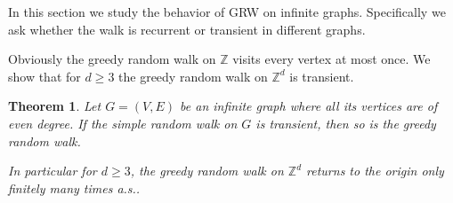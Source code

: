 \documentclass[12pt,a4paper]{article}
\newcommand{\0}{{\bf 0}}
\newcommand{\Z}{{\mathbb Z}}
\newtheorem{theorem}{Theorem}[section]
\begin{document}
    In this section we study the behavior of GRW on infinite graphs.
    Specifically we ask whether the walk is recurrent or transient in different graphs.

    Obviously the greedy random walk on $\Z$ visits every vertex at most once.
    We show that for $d \geq 3$ the greedy random walk on $\Z^d$ is transient.

    \begin{theorem}\label{thm:Z^d}
        Let $G = (V,E)$ be an infinite graph where all its vertices are of even degree.
        If the simple random walk on $G$ is transient, then so is the greedy random walk.

        In particular for $d \geq 3$, the greedy random walk on $\Z^d$ returns to the origin only finitely many times a.s..
    \end{theorem}
\end{document}
